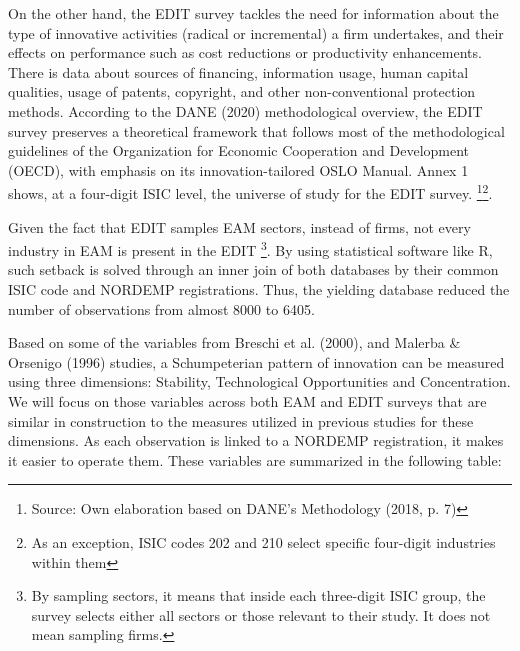 \documentclass[12pt,a4paper]{article}
\begin{document}
On the other hand, the EDIT survey tackles the need for information about the type of innovative activities (radical or incremental) a firm undertakes, and their effects on performance such as cost reductions or productivity enhancements. There is data about sources of financing, information usage, human capital qualities, usage of patents, copyright, and other non-conventional protection methods. According to the DANE (2020) methodological overview, the EDIT survey preserves a theoretical framework that follows most of the methodological guidelines of the Organization for Economic Cooperation and Development (OECD), with emphasis on its innovation-tailored OSLO Manual. Annex 1 shows, at a four-digit ISIC level, the universe of study for the EDIT survey.  \footnote{Source: Own elaboration based on DANE's Methodology (2018, p. 7)}\footnote{As an exception, ISIC codes 202 and 210 select specific four-digit industries within them}. 

Given the fact that EDIT samples EAM sectors, instead of firms, not every industry in EAM is present in the EDIT \footnote{By sampling sectors, it means that inside each three-digit ISIC group, the survey selects either all sectors or those relevant to their study. It does not mean sampling firms.}. By using statistical software like R, such setback is solved through an inner join of both databases by their common ISIC code and NORDEMP registrations. Thus, the yielding database reduced the number of observations from almost 8000 to 6405.  

Based on some of the variables from Breschi et al. (2000), and Malerba \& Orsenigo (1996) studies, a Schumpeterian pattern of innovation can be measured using three dimensions: Stability, Technological Opportunities and Concentration. We will focus on those variables across both EAM and EDIT surveys that are similar in construction to the measures utilized in previous studies for these dimensions. As each observation is linked to a NORDEMP registration, it makes it easier to operate them. These variables are summarized in the following table:  \vfill

\pagebreak
\end{document}
